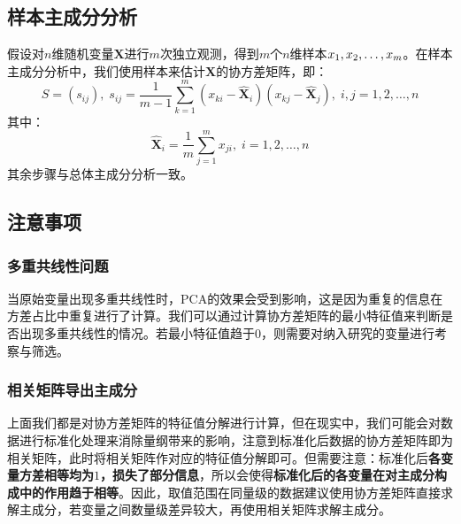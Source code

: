 \subsection{样本主成分分析}
假设对$n$维随机变量$\mathbf{X}$进行$m$次独立观测，得到$m$个$n$维样本$x_1, x_2, \dots, x_{m}$。在样本主成分分析中，我们使用样本来估计$\mathbf{X}$的协方差矩阵，即：
\begin{equation*}
	S=(s_{ij}),\;s_{ij}=\frac{1}{m-1}\sum_{k=1}^{m}(x_{ki}-\hat{\mathbf{X}}_i)(x_{kj}-\hat{\mathbf{X}}_j),\;i,j=1,2,\dots,n
\end{equation*}
其中：
\begin{equation*}
	\hat{\mathbf{X}}_i=\frac{1}{m}\sum_{j=1}^{m}x_{ji},\;i=1,2,\dots,n
\end{equation*}
其余步骤与总体主成分分析一致。

\subsection{注意事项}
\subsubsection{多重共线性问题}
当原始变量出现多重共线性时，PCA的效果会受到影响，这是因为重复的信息在方差占比中重复进行了计算。我们可以通过计算协方差矩阵的最小特征值来判断是否出现多重共线性的情况。若最小特征值趋于$0$，则需要对纳入研究的变量进行考察与筛选。
\subsubsection{相关矩阵导出主成分}
上面我们都是对协方差矩阵的特征值分解进行计算，但在现实中，我们可能会对数据进行标准化处理来消除量纲带来的影响，注意到标准化后数据的协方差矩阵即为相关矩阵，此时将相关矩阵作对应的特征值分解即可。但需要注意：标准化后\textbf{各变量方差相等均为$1$，损失了部分信息}，所以会使得\textbf{标准化后的各变量在对主成分构成中的作用趋于相等}。因此，取值范围在同量级的数据建议使用协方差矩阵直接求解主成分，若变量之间数量级差异较大，再使用相关矩阵求解主成分。
